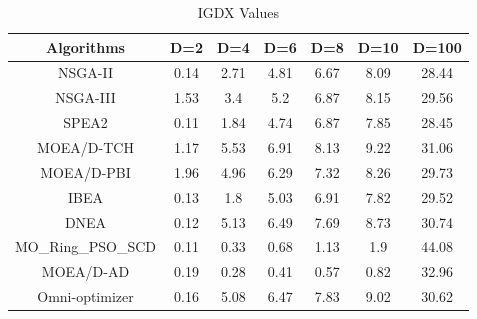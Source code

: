 \documentclass[conference]{IEEEtran}
\begin{document}
\begin{table}[t!]
\centering
\caption{IGDX Values}
\begin{tabular}{@{}ccccccc@{}}
\toprule
Algorithms      & D=2                          & D=4                          & D=6                          & D=8                          & D=10                         & D=100                         \\ \midrule
NSGA-II         & 0.14                         & 2.71                         & 4.81                         & 6.67                         & 8.09                         & \cellcolor[HTML]{F8FF00}28.44                         \\
NSGA-III        & 1.53                         & 3.4                          & 5.2                          & 6.87                         & 8.15                         & 29.56                         \\
SPEA2           & \cellcolor[HTML]{F8FF00}0.11 & 1.84                         & 4.74                         & 6.87                         & 7.85                         & 28.45 \\
MOEA/D-TCH      & 1.17                         & 5.53                         & 6.91                         & 8.13                         & 9.22                          & 31.06                         \\
MOEA/D-PBI      & 1.96                         & 4.96                         & 6.29                         & 7.32                         & 8.26                         & 29.73                         \\
IBEA            & 0.13                         & 1.8                          & 5.03                         & 6.91                         & 7.82                         & 29.52                         \\
DNEA            & 0.12                         & 5.13                         & 6.49                         & 7.69                         & 8.73                         & 30.74                         \\
MO\_Ring\_PSO\_SCD & \cellcolor[HTML]{F8FF00}0.11 & 0.33                         & 0.68                         & 1.13                         & 1.9                          & 44.08                         \\
MOEA/D-AD       & 0.19                         & \cellcolor[HTML]{F8FF00}0.28 & \cellcolor[HTML]{F8FF00}0.41 & \cellcolor[HTML]{F8FF00}0.57 & \cellcolor[HTML]{F8FF00}0.82 & 32.96                         \\
Omni-optimizer  & 0.16                         & 5.08                         & 6.47                         & 7.83                         & 9.02                         & 30.62                         \\ \bottomrule
\end{tabular}
\label{table: IGDX sumup}
\end{table}
\end{document}
